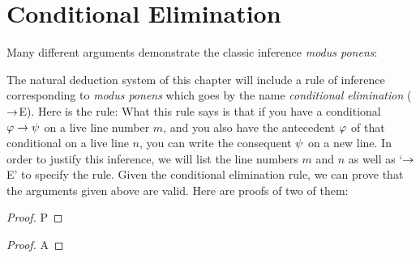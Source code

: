 \section{Conditional Elimination}

Many different arguments demonstrate the classic inference \emph{modus ponens}:

\begin{multicols}{3}
\begin{earg}
\end{earg}

\begin{earg}
\end{earg}

\begin{earg}
\end{earg}

\end{multicols}

The natural deduction system of this chapter will include a rule of inference corresponding to \emph{modus ponens} which goes by the name \textit{conditional elimination} ($\rightarrow$E).
Here is the rule:
What this rule says is that if you have a conditional $\varphi\rightarrow\psi$ on a live line number $m$, and you also have the antecedent $\varphi$ of that conditional on a live line $n$, you can write the consequent $\psi$ on a new line.
In order to justify this inference, we will list the line numbers $m$ and $n$ as well as `$\rightarrow$E' to specify the rule.
Given the conditional elimination rule, we can prove that the arguments given above are valid.
Here are proofs of two of them:


\begin{multicols}{2}

\begin{proof}
	 \pr{}
	P \pr{}
	 
\end{proof}


\begin{proof}
	 \pr{}
	 \pr{}
	A 
\end{proof}

\end{multicols}

